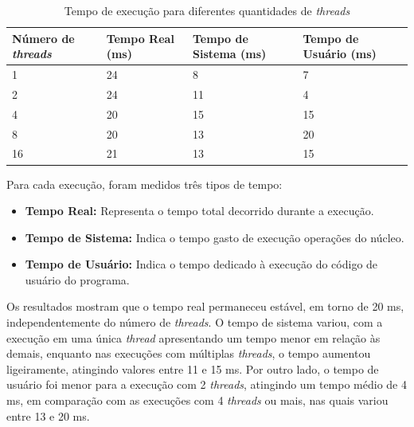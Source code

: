 \documentclass[
	12pt,				%
	oneside,   	        %
	a4paper,			%
	english,			%
	french,				%
	spanish,			%
	brazil,				%
	]{pacotes/abntex2}
\begin{document}
\begin{table}[!htb]
\centering
\caption{Tempo de execução para diferentes quantidades de \textit{threads}}
\label{table:time}
\footnotesize
\begin{tabular}{@{}l|lll@{}}
\toprule
\textbf{Número de \textit{threads}} & \textbf{Tempo Real (ms)} & \textbf{Tempo de Sistema (ms)} & \textbf{Tempo de Usuário (ms)}\\ 
\midrule
1 & 24 & 8 & 7 \\
2 & 24 & 11 & 4 \\
4 & 20 & 15 & 15 \\
8 & 20 & 13 & 20 \\
16 & 21 & 13 & 15 \\
\bottomrule
\end{tabular}
\end{table}

Para cada execução, foram medidos três tipos de tempo:

\begin{itemize}
    \item \textbf{Tempo Real:} Representa o tempo total decorrido durante a execução.
    \item \textbf{Tempo de Sistema:} Indica o tempo gasto de execução operações do núcleo.
    \item \textbf{Tempo de Usuário:} Indica o tempo dedicado à execução do código de usuário do programa.
\end{itemize}

Os resultados mostram que o tempo real permaneceu estável, em torno de 20 ms, independentemente do número de \textit{threads}. O tempo de sistema variou, com a execução em uma única \textit{thread} apresentando um tempo menor em relação às demais, enquanto nas execuções com múltiplas \textit{threads}, o tempo aumentou ligeiramente, atingindo valores entre 11 e 15 ms. Por outro lado, o tempo de usuário foi menor para a execução com 2 \textit{threads}, atingindo um tempo médio de 4 ms, em comparação com as execuções com 4 \textit{threads} ou mais, nas quais variou entre 13 e 20 ms.
\end{document}
